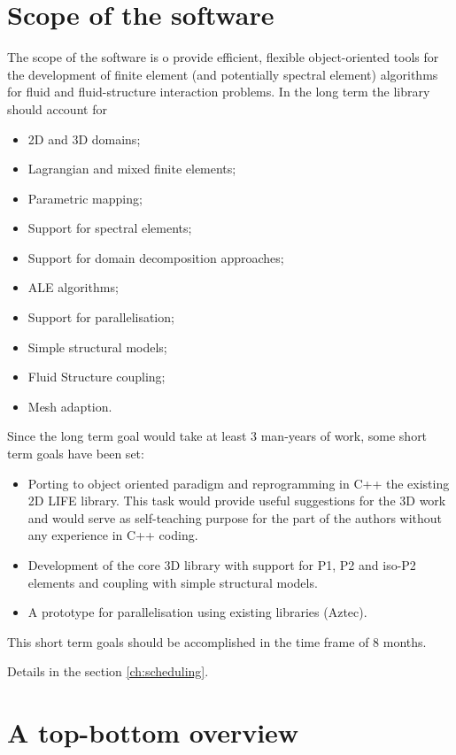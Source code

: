 %
\section{Scope of the software}
\label{sec:scope-software}
%
%
The scope of the software is o provide efficient, flexible
object-oriented tools for the development of finite element (and
potentially spectral element) algorithms for fluid and fluid-structure
interaction problems.  In the long term the library should account for
\begin{itemize}
\item 2D and 3D domains;
\item Lagrangian and mixed finite elements;
\item Parametric mapping;
\item Support for spectral elements;
\item Support for domain decomposition approaches;
\item ALE algorithms;
\item Support for parallelisation;
\item Simple structural models;
\item Fluid Structure coupling;
\item Mesh adaption.
\end{itemize}
Since the long term goal would take at least 3 man-years of work, some
short term goals have been set:
\begin{itemize}
\item Porting to object oriented paradigm and reprogramming in C++ the
  existing 2D LIFE library. This task would provide useful suggestions
  for the 3D work and would serve as self-teaching purpose for the
  part of the authors without any experience in C++ coding.
\item Development of the core 3D library with support for P1, P2 and
  iso-P2 elements and coupling with simple structural models.
\item A prototype for parallelisation using existing libraries
  (Aztec).
\end{itemize} 
This short term goals should be accomplished in the time frame of 8
months.

Details in the section \ref{ch:scheduling}.


\section{A top-bottom overview} 
\label{sec:top-bottom-overview}
% 
